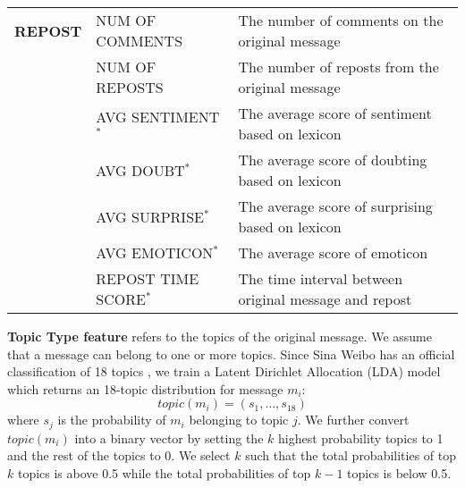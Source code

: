 \begin{table*}[th]
\begin{tabular}{@{}cll@{}}
\textbf{REPOST} & NUM OF COMMENTS        & The number of comments on the original message              \\
                     & NUM OF REPOSTS         & The number of reposts from the original message            \\
                     & AVG SENTIMENT$^*$      & The average score of sentiment based on lexicon              \\
\multicolumn{1}{l}{} & AVG DOUBT$^*$          & The average score of doubting based on lexicon               \\
\multicolumn{1}{l}{} & AVG SURPRISE$^*$       & The average score of surprising based on lexicon             \\
                     & AVG EMOTICON$^*$       & The average score of emoticon                                \\
                     & REPOST TIME SCORE$^*$  & The time interval between
original message and repost \\ \bottomrule
\end{tabular}
\end{table*}

%

\textbf{Topic Type feature} refers to the topics of the
original message. We assume that a message can belong to one or more topics.
Since Sina Weibo has an official classification
of 18 topics \cite{website:Huati},
we train a Latent Dirichlet Allocation (LDA) \cite{BleiNj03}
model which returns an 18-topic distribution for message $m_i$:
\begin{equation}
topic(m_i) = (s_1,\ldots,s_{18})
\end{equation}
where $s_j$ is the probability of $m_i$ belonging to topic $j$.
We further convert $topic(m_i)$ into a binary vector by setting
the $k$ highest probability topics to 1 and the rest of the topics to 0.
We select $k$ such that the total probabilities of top $k$ topics is
above 0.5 while the total probabilities of top $k-1$ topics is below 0.5.

